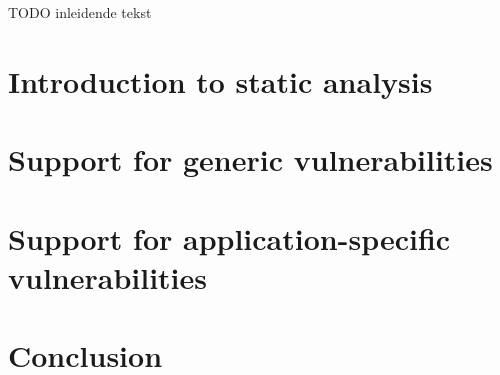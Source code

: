 TODO inleidende tekst

\section{Introduction to static analysis}
\label{subsec:staticAnalysis}
\section{Support for generic vulnerabilities}
\section{Support for application-specific vulnerabilities}
\section{Conclusion}

